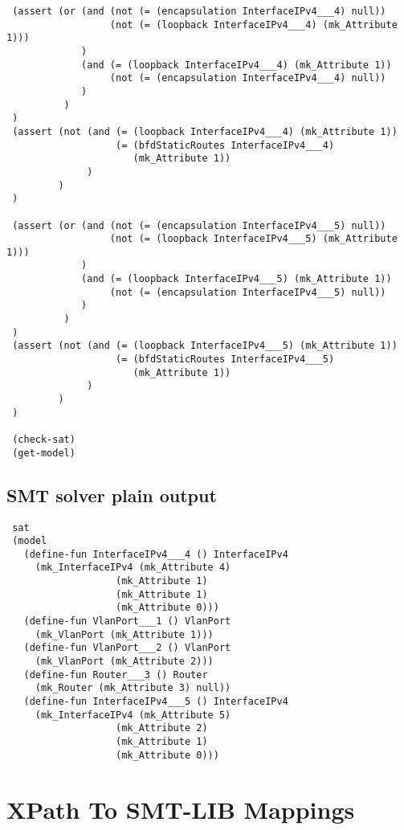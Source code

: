 \documentclass[12pt,swedish,english]{report}
\theoremstyle{definition}
\begin{document}
\begin{appendices}
\begin{verbatim}
 (assert (or (and (not (= (encapsulation InterfaceIPv4___4) null))
                  (not (= (loopback InterfaceIPv4___4) (mk_Attribute 1)))
             )
             (and (= (loopback InterfaceIPv4___4) (mk_Attribute 1))
                  (not (= (encapsulation InterfaceIPv4___4) null))
             )
          )
 )
 (assert (not (and (= (loopback InterfaceIPv4___4) (mk_Attribute 1))
                   (= (bfdStaticRoutes InterfaceIPv4___4) 
                      (mk_Attribute 1))
              )
         )
 )
 
 (assert (or (and (not (= (encapsulation InterfaceIPv4___5) null))
                  (not (= (loopback InterfaceIPv4___5) (mk_Attribute 1)))
             )
             (and (= (loopback InterfaceIPv4___5) (mk_Attribute 1))
                  (not (= (encapsulation InterfaceIPv4___5) null))
             )
          )
 )
 (assert (not (and (= (loopback InterfaceIPv4___5) (mk_Attribute 1))
                   (= (bfdStaticRoutes InterfaceIPv4___5) 
                      (mk_Attribute 1))
              )
         )
 )
 
 (check-sat)
 (get-model)
 \end{verbatim}
 
 \section{SMT solver plain output}
 
 \begin{verbatim}
 sat
 (model 
   (define-fun InterfaceIPv4___4 () InterfaceIPv4
     (mk_InterfaceIPv4 (mk_Attribute 4)
                   (mk_Attribute 1)
                   (mk_Attribute 1)
                   (mk_Attribute 0)))
   (define-fun VlanPort___1 () VlanPort
     (mk_VlanPort (mk_Attribute 1)))
   (define-fun VlanPort___2 () VlanPort
     (mk_VlanPort (mk_Attribute 2)))
   (define-fun Router___3 () Router
     (mk_Router (mk_Attribute 3) null))
   (define-fun InterfaceIPv4___5 () InterfaceIPv4
     (mk_InterfaceIPv4 (mk_Attribute 5)
                   (mk_Attribute 2)
                   (mk_Attribute 1)
                   (mk_Attribute 0)))
 \end{verbatim}
 
 
 
 \chapter{XPath To SMT-LIB Mappings}\label{app:smt-map}


\end{appendices}
\end{document}
